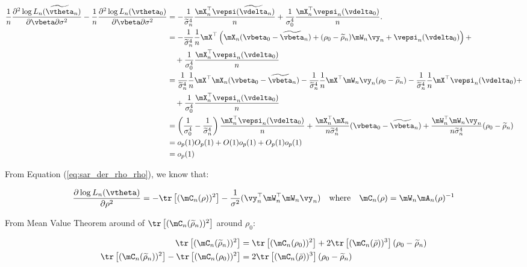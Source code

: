 \begin{subappendices}
\begin{enumerate}
      \begin{equation*}
    \begin{aligned}
    \frac{1}{n}\frac{\partial^2 \log L_n(\widetilde{\vtheta}_n)}{\partial \vbeta \partial \sigma^2} - \frac{1}{n}\frac{\partial^2 \log L_n(\vtheta_0)}{\partial \vbeta \partial \sigma^2} & = - \frac{1}{\widetilde{\sigma}^4_n} \frac{\mX_n^\top \vepsi(\widetilde{\vdelta}_n)}{n}+  \frac{1}{\sigma^4_0} \frac{\mX^\top_n \vepsi_n(\vdelta_0)}{n}. \\
    & = - \frac{1}{\widetilde{\sigma}^4_n}\frac{1}{n}\mX^\top\left(\mX_n(\vbeta_0 - \widetilde{\vbeta}_n) + (\rho_0 - \widetilde{\rho}_n)\mW_n\vy_n + \vepsi_n(\vdelta_0) \right)+  \\
    & \quad + \frac{1}{\sigma^4_0} \frac{\mX^\top_n \vepsi_n(\vdelta_0)}{n} \\
  & = \frac{1}{\widetilde{\sigma}^4_n}\frac{1}{n}\mX^\top\mX_n(\vbeta_0 - \widetilde{\vbeta}_n) - \frac{1}{\widetilde{\sigma}^4_n}\frac{1}{n}\mX^\top\mW_n\vy_n(\rho_0 - \widetilde{\rho}_n) - \frac{1}{\widetilde{\sigma}^4_n}\frac{1}{n}\mX^\top \vepsi_n(\vdelta_0) + \\
   & \quad + \frac{1}{\sigma^4_0} \frac{\mX^\top_n \vepsi_n(\vdelta_0)}{n} \\
  & = \left(\frac{1}{\sigma^4_0} - \frac{1}{\widetilde{\sigma}^4_n}\right)\frac{\mX^\top_n \vepsi_n(\vdelta_0)}{n} + \frac{\mX^\top_n\mX_n}{n\widetilde{\sigma}^4_n}(\vbeta_0 - \widetilde{\vbeta}_n) + \frac{\mW_n^\top\mW_n\vy_n}{n\widetilde{\sigma}^4_n}(\rho_0 - \widetilde{\rho}_n) \\
  & = o_p(1)O_p(1) + O(1)o_p(1) + O_p(1)o_p(1) \\
  & = o_p(1)
    \end{aligned}
   \end{equation*}
   
   From Equation (\ref{eq:sar_der_rho_rho}), we know that:
   
   \begin{equation*}
   \frac{\partial \log L_n(\vtheta) }{\partial \rho ^2} = - \tr\left[(\mC_n(\rho))^2\right] - \frac{1}{\sigma^2}(\vy_n^{\top}\mW^{\top}_n\mW_n\vy_n)\quad \mbox{where}\quad \mC_n(\rho) = \mW_n\mA_n(\rho)^{-1}
   \end{equation*}
   
   From Mean Value Theorem around of  $\tr\left[(\mC_n(\widetilde{\rho}_n))^2\right]$ around $\rho_0$:
   
   \begin{equation*}
    \begin{aligned}
    \tr\left[(\mC_n(\widetilde{\rho}_n))^2\right] & = \tr\left[(\mC_n(\rho_0))^2\right]+ 2\tr\left[(\mC_n(\bar{\rho}))^3\right](\rho_0 - \widetilde{\rho}_n) \\
    \tr\left[(\mC_n(\widetilde{\rho}_n))^2\right] - \tr\left[(\mC_n(\rho_0))^2\right] & = 2\tr\left[(\mC_n(\bar{\rho}))^3\right](\rho_0 - \widetilde{\rho}_n)
    \end{aligned}
   \end{equation*}
   

\end{enumerate}
\end{subappendices}
